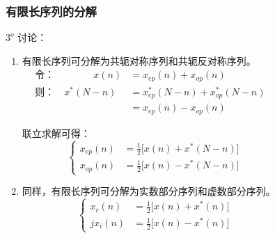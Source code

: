 \documentclass[notheorems,compress,mathserif,table]{beamer}
\begin{document}
\begin{frame}[shrink]\frametitle{ 有限长序列的分解}%
$3^o$ 讨论：
\begin{enumerate}
  \item 有限长序列可分解为共轭对称序列和共轭反对称序列。
\begin{equation*}
        \begin{split}
        \mbox{令} ： \quad\quad\quad\quad x(n)  &=  x_{ep}(n) + x_{op}(n)   \\
        \mbox{则} ： \quad   x^*(N-n)           &= x_{ep}^*(N-n) + x_{op}^*(N-n)  \quad\quad\quad\quad\quad\quad\quad\quad  \\
                                                &= x_{ep}(n) - x_{op}(n)
        \end{split}
        \end{equation*}

        联立求解可得：
        \begin{equation*} %
        \left\{ \begin{aligned}
            x_{ep}(n) &= \frac{1}{2}\big[x(n) + x^{*}(N-n)\big]  \quad\quad\quad\quad\quad\quad\quad\\
            x_{op}(n) &= \frac{1}{2}\big[x(n) - x^{*}(N-n)\big]
        \end{aligned} \right.
        \end{equation*}
        
\item 同样，有限长序列可分解为实数部分序列和虚数部分序列。
        \begin{equation*} %
        \left\{ \begin{aligned}
            x_{r}(n)  &= \frac{1}{2}\big[x(n) + x^{*}(n)\big]   \quad\quad\quad\quad\quad\quad\quad\\
            jx_{i}(n) &= \frac{1}{2}\big[x(n) - x^{*}(n)\big]
        \end{aligned} \right.
        \end{equation*}
\end{enumerate}        
\end{frame}



%
%
%
\end{document}
